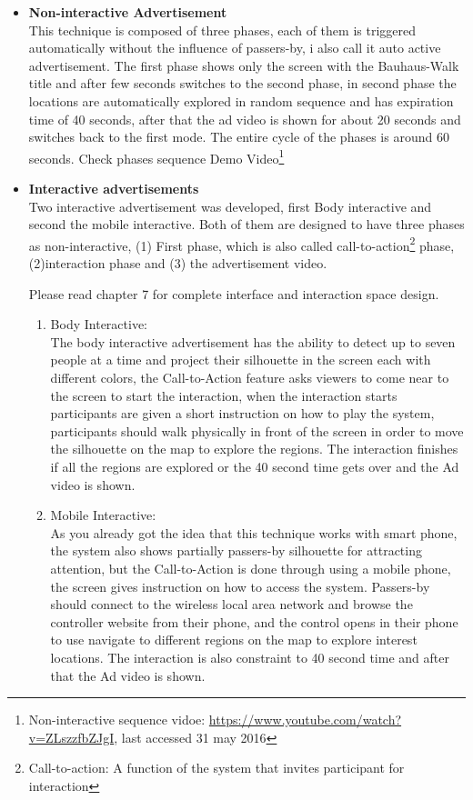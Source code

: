 \begin{itemize}
\item \textbf{Non-interactive Advertisement} \\
This technique is composed of three phases, each of them is triggered automatically without the influence of passers-by, i also call it auto active advertisement. The first phase shows only the screen with the Bauhaus-Walk title and after few seconds switches to the second phase, in second phase the locations are automatically explored in random sequence and has expiration time of 40 seconds, after that the ad video is shown for about 20 seconds and switches back to the first mode. The entire cycle of the phases is around 60 seconds. Check phases sequence Demo Video\footnote{Non-interactive sequence vidoe: \url{https://www.youtube.com/watch?v=ZLszzfbZJgI}, last accessed 31 may 2016} \\

\item \textbf{Interactive advertisements} \\
Two interactive advertisement was developed, first Body interactive and second the mobile interactive. Both of them are designed to have three phases as non-interactive, (1) First phase, which is also called call-to-action\footnote{Call-to-action: A function of the system that invites participant for interaction} phase, (2)interaction phase and (3) the advertisement video. 
 
Please read chapter 7 for complete interface and interaction space design.

\begin{enumerate}

\item Body Interactive: \\
The body interactive advertisement has the ability to detect up to seven people at a time and project their silhouette in the screen each with different colors, the Call-to-Action feature asks viewers to come near to the screen to start the interaction, when the interaction starts participants are given a short instruction on how to play the system, participants should walk physically in front of the screen in order to move the silhouette on the map to explore the regions. The interaction finishes if all the regions are explored or the 40 second time gets over and the Ad video is shown.


\item Mobile Interactive: \\
As you already got the idea that this technique works with smart phone, the system also shows partially passers-by silhouette for attracting attention, but the Call-to-Action is done through using a mobile phone, the screen gives instruction on how to access the system. Passers-by should connect to the wireless local area network and browse the controller website from their phone, and the control opens in their phone to use navigate to different regions on the map to explore interest locations. The interaction is also constraint to 40 second time and after that the Ad video is shown.




\end{enumerate}
\end{itemize}
